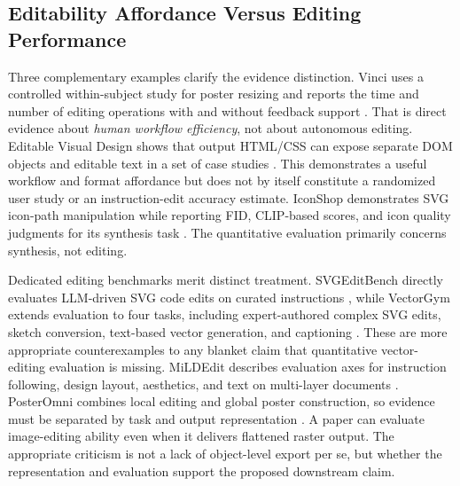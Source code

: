 \subsection{Editability Affordance Versus Editing Performance}
Three complementary examples clarify the evidence distinction. Vinci uses a controlled within-subject study for poster resizing and reports the time and number of editing operations with and without feedback support \citep{vinci2021}. That is direct evidence about \emph{human workflow efficiency}, not about autonomous editing. Editable Visual Design shows that output HTML/CSS can expose separate DOM objects and editable text in a set of case studies \citep{editablevisual2026}. This demonstrates a useful workflow and format affordance but does not by itself constitute a randomized user study or an instruction-edit accuracy estimate. IconShop demonstrates SVG icon-path manipulation while reporting FID, CLIP-based scores, and icon quality judgments for its synthesis task \citep{iconshop2023}. The quantitative evaluation primarily concerns synthesis, not editing.

Dedicated editing benchmarks merit distinct treatment. SVGEditBench directly evaluates LLM-driven SVG code edits on curated instructions \citep{svgeditbench2024}, while VectorGym extends evaluation to four tasks, including expert-authored complex SVG edits, sketch conversion, text-based vector generation, and captioning \citep{vectorgym2026}. These are more appropriate counterexamples to any blanket claim that quantitative vector-editing evaluation is missing. MiLDEdit describes evaluation axes for instruction following, design layout, aesthetics, and text on multi-layer documents \citep{mildedit2026}. PosterOmni combines local editing and global poster construction, so evidence must be separated by task and output representation \citep{posteromni2026}. A paper can evaluate image-editing ability even when it delivers flattened raster output. The appropriate criticism is not a lack of object-level export per se, but whether the representation and evaluation support the proposed downstream claim.

